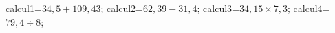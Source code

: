 \documentclass[exercice]{thedocument}%
\begin{document}
%
\>calcul1=$34,5+109,43$;%
\>calcul2=$62,39-31,4$;%
\>calcul3=$34,15\times7,3$;%
\>calcul4=$79,4\div8$;%
%
\end{document}
